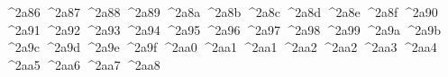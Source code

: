 {  ^^^^2a86%
  ^^^^2a87%
  ^^^^2a88%
  ^^^^2a89%
  ^^^^2a8a%
  ^^^^2a8b%
  ^^^^2a8c%
  ^^^^2a8d%
  ^^^^2a8e%
  ^^^^2a8f%
  ^^^^2a90%
  ^^^^2a91%
  ^^^^2a92%
  ^^^^2a93%
  ^^^^2a94%
  ^^^^2a95%
  ^^^^2a96%
  ^^^^2a97%
  ^^^^2a98%
  ^^^^2a99%
  ^^^^2a9a%
  ^^^^2a9b%
  ^^^^2a9c%
  ^^^^2a9d%
  ^^^^2a9e%
  ^^^^2a9f%
  ^^^^2aa0%
  ^^^^2aa1%
  ^^^^2aa1%
  ^^^^2aa2%
  ^^^^2aa2%
  ^^^^2aa3%
  ^^^^2aa4%
  ^^^^2aa5%
  ^^^^2aa6%
  ^^^^2aa7%
  ^^^^2aa8%
}
